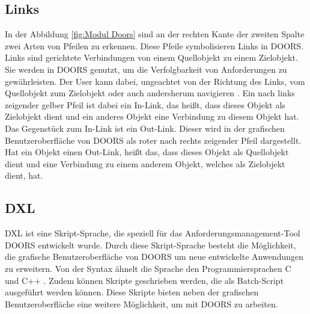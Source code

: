 \subsection{Links}
In der Abbildung \ref*{fig:Modul Doors} sind an der rechten Kante der zweiten Spalte zwei Arten von Pfeilen zu erkennen. Diese Pfeile
symbolisieren Links in \acs{DOORS}. Links sind gerichtete Verbindungen von einem Quellobjekt zu einem Zielobjekt. Sie werden in \acs{DOORS} 
genutzt, um die Verfolgbarkeit von Anforderungen zu gewährleisten. Der User kann 
dabei, ungeachtet von der Richtung des Links, vom Quellobjekt zum Zielobjekt oder auch andersherum navigieren \cite[S.183]{DOORS}. 
Ein nach links zeigender gelber Pfeil ist dabei ein In-Link, das heißt, dass dieses Objekt als Zielobjekt dient und ein anderes Objekt 
eine Verbindung zu diesem Objekt hat. Das Gegenstück zum In-Link ist ein Out-Link. Dieser wird in der grafischen Benutzeroberfläche von 
\acs{DOORS} als roter nach rechts zeigender Pfeil dargestellt. Hat ein Objekt einen Out-Link, heißt das, dass dieses Objekt als Quellobjekt 
dient und eine Verbindung zu einem anderem Objekt, welches als Zielobjekt dient, hat.   

\subsection{DXL}

\ac*{DXL} ist eine Skript-Sprache, die speziell für das Anforderungsmanagement-Tool \acs{DOORS} entwickelt wurde. Durch diese Skript-Sprache
besteht die Möglichkeit, die grafische Benutzeroberfläche von \acs{DOORS} um neue entwickelte Anwendungen zu
erweitern. Von der Syntax ähnelt die Sprache den Programmiersprachen C und C++ \cite[S.1]{DXL}. Zudem können Skripte geschrieben werden,
die als Batch-Script ausgeführt werden können. Diese Skripte bieten neben der grafischen Benutzeroberfläche eine weitere Möglichkeit, 
um mit \acs{DOORS} zu arbeiten. 
